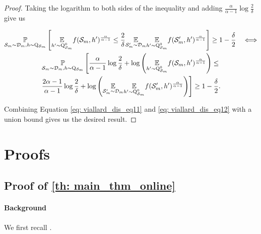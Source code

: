 \begin{proof}
Taking the logarithm to both sides of the inequality and adding $\frac{\alpha}{\alpha-1} \log \frac{2}{\delta}$ give us

\begin{multline}
\underset{\mathcal{S}_m \sim \mathcal{D}_{m}, h \sim \mathrm{Q}_{\mathcal{S}_m}}{\mathbb{P}}\left[\underset{h^{\prime} \sim \mathrm{Q}_{\mathcal{S}_m}^0}{\mathbb{E}} f(\mathcal{S}_m,h')^{\frac{\alpha}{\alpha-1}} \leq \frac{2}{\delta} \underset{\mathcal{S}_m^{\prime} \sim \mathcal{D}_{m}}{\mathbb{E}} \underset{h^{\prime} \sim \mathrm{Q}_{\mathcal{S}_m}^0}{\mathbb{E}} f(\mathcal{S}_m',h')^{\frac{\alpha}{\alpha-1}}\right] \geq 1-\frac{\delta}{2} \quad \Longleftrightarrow \\
\label{eq: viallard_dis_eq12}
\underset{\mathcal{S}_m \sim \mathcal{D}_{m}, h \sim \mathrm{Q}_{\mathcal{S}_m}}{\mathbb{P}}\left[\frac{\alpha}{\alpha-1} \log \frac{2}{\delta}+\log \left(\underset{h^{\prime} \sim \mathrm{Q}_{\mathcal{S}_m}^0}{\mathbb{E}} f(\mathcal{S}_m,h')^{\frac{\alpha}{\alpha-1}}\right) \leq \right. \\
 \left. \frac{2 \alpha-1}{\alpha-1} \log \frac{2}{\delta}+\log \left(\underset{\mathcal{S}_m^{\prime} \sim \mathcal{D}_{m}}{\mathbb{E}} \underset{h^{\prime} \sim \mathrm{Q}_{\mathcal{S}_m}^0}{\mathbb{E}} f(\mathcal{S}_m',h')^{\frac{\alpha}{\alpha-1}}\right)\right] \geq 1-\frac{\delta}{2} .
\end{multline}

Combining Equation \cref{eq: viallard_dis_eq11} and \cref{eq: viallard_dis_eq12} with a union bound gives us the desired result.
\end{proof}











\section{Proofs}
\label{sec: proofs-chap3}

\subsection{Proof of \cref{th: main_thm_online}}

\label{sec: proof_main_thm_online}




\paragraph{Background} We first recall \cite[Thm 2]{rivasplata2020pac}.

